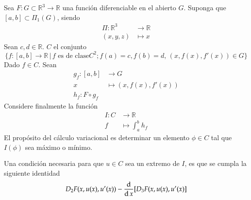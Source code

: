 Sea $F: G \subset \mathbb{R}^3 \to \mathbb{R}$ una función diferenciable en el
abierto $G$. Suponga que $[a,b] \subset \Pi_1(G)$, siendo
\begin{align*}
  \Pi : \mathbb{R}^3 &\to \mathbb{R} \\
  (x,y,z) &\mapsto x
\end{align*}
Sean $c, d \in \mathbb{R}$. $C$ el conjunto
\[
  \{f: [a,b] \to \mathbb{R} \, | \, f \mbox{ es de clase} C^2; f(a) = c%
  , f(b) = d, \, (x, f(x), f'(x)) \in G \}
\]
Dado $f \in C$. Sean
\begin{align*}
  g_f : [a, b] &\to G \\
  x &\mapsto (x, f(x), f'(x)) \\
  h_f : F \circ g_f
\end{align*}
Considere finalmente la función
\begin{align*}
  I: C &\to \mathbb{R} \\
  f &\mapsto \int_a^b h_f
\end{align*}
El propósito del cálculo variacional es determinar un elemento $\phi \in C$ tal
que $I(\phi)$ sea máximo o mínimo.
\begin{proposition}[Euler 1977]
 Una condición necesaria para que $u \in C$ sea un extremo de $I$, es que se
 cumpla la siguiente identidad
 \[
   D_2F(x,u(x),u'(x)) - \frac{\operatorname{d}}{\operatorname{d} x} [D_3 F(x, u(x), u'(x)]  
 \]
\end{proposition}

